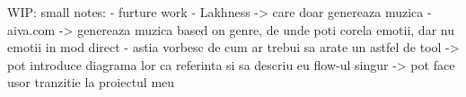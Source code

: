 WIP:
small notes:
- furture work
- Lakhness -> care doar genereaza muzica
- aiva.com -> genereaza muzica based on genre, de unde poti corela emotii, dar nu emotii in mod direct
- astia vorbesc de cum ar trebui sa arate un astfel de tool
-> pot introduce diagrama lor ca referinta si sa descriu eu flow-ul singur
-> pot face usor tranzitie la proiectul meu
